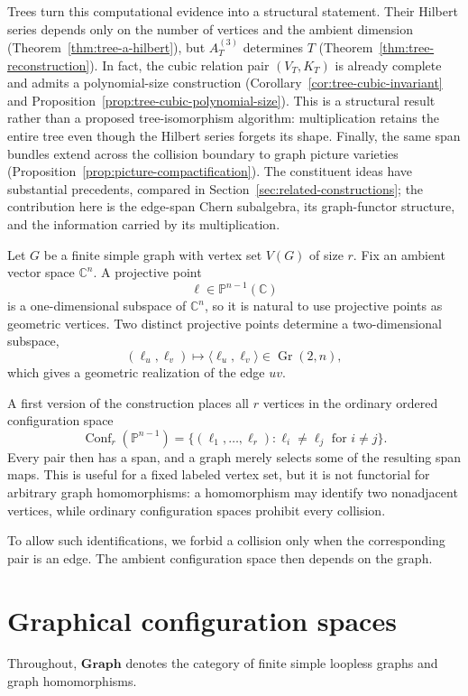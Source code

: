 \documentclass[11pt]{amsart}
\theoremstyle{plain}
\theoremstyle{definition}
\theoremstyle{remark}
\newcommand{\C}{\mathbb{C}}
\newcommand{\PP}{\mathbb{P}}
\newcommand{\Conf}{\operatorname{Conf}}
\newcommand{\Gr}{\operatorname{Gr}}
\newcommand{\Graphs}{\mathbf{Graph}}
\begin{document}
Trees turn this computational evidence into a structural statement.  Their
Hilbert series depends only on the number of vertices and the ambient
dimension (Theorem~\ref{thm:tree-a-hilbert}), but $A_T^{(3)}$ determines $T$
(Theorem~\ref{thm:tree-reconstruction}).  In fact, the cubic relation pair
$(V_T,K_T)$ is already complete and admits a polynomial-size construction
(Corollary~\ref{cor:tree-cubic-invariant} and
Proposition~\ref{prop:tree-cubic-polynomial-size}).  This is a structural
result rather than a proposed tree-isomorphism algorithm: multiplication
retains the entire tree even though the Hilbert series forgets its shape.
Finally, the same span bundles extend across the collision boundary to graph
picture varieties (Proposition~\ref{prop:picture-compactification}).  The
constituent ideas have substantial precedents, compared in
Section~\ref{sec:related-constructions}; the contribution here is the
edge-span Chern subalgebra, its graph-functor structure, and the information
carried by its multiplication.

Let $G$ be a finite simple graph with vertex set $V(G)$ of size $r$.  Fix an
ambient vector space $\C^n$.  A projective point
\[
  \ell\in \PP^{n-1}(\C)
\]
is a one-dimensional subspace of $\C^n$, so it is natural to use projective
points as geometric vertices.  Two distinct projective points determine a
two-dimensional subspace,
\[
  (\ell_u,\ell_v)\longmapsto \langle \ell_u,\ell_v\rangle
  \in \Gr(2,n),
\]
which gives a geometric realization of the edge $uv$.

A first version of the construction places all $r$ vertices in the ordinary
ordered configuration space
\[
  \Conf_r(\PP^{n-1})
  =\{(\ell_1,\ldots,\ell_r):\ell_i\neq \ell_j\text{ for }i\neq j\}.
\]
Every pair then has a span, and a graph merely selects some of the resulting
span maps.  This is useful for a fixed labeled vertex set, but it is not
functorial for arbitrary graph homomorphisms: a homomorphism may identify two
nonadjacent vertices, while ordinary configuration spaces prohibit every
collision.

To allow such identifications, we forbid a collision only when the
corresponding pair is an edge.  The ambient configuration space then depends
on the graph.

\section{Graphical configuration spaces}

Throughout, $\Graphs$ denotes the category of finite simple loopless graphs and
graph homomorphisms.
\end{document}

